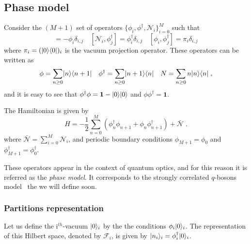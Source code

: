 \documentclass[a4paper,11pt]{amsart}
\begin{document}

\subsection{Phase model}
Consider the \((M+1)\) set of operators \(\{\phi_i,
\phi^\dagger,\mathcal{N}_i\}_{i=0}^M\) such that
\begin{equation}
 [\mathcal{N}_i, \phi_j] = - \phi_i \delta_{i,j} \quad
 [\mathcal{N}_i, \phi_j^\dagger] =  \phi_i^\dagger \delta_{i,j}  \quad 
 [\phi_i, \phi_j^\dagger] =  \pi_i \delta_{i,j}  
\end{equation}
where \(\pi_i =(\lvert0\rangle \langle0\rvert)_i\) is the vacuum projection operator.
These operators can be written as
\begin{equation}
\phi = \sum_{n\geq 0}\lvert n\rangle\langle n+1\rvert\quad 
\phi^\dagger = \sum_{n\geq 0}\lvert n+1\rangle\langle n\rvert \quad 
N = \sum_{n\geq 0}n\lvert n\rangle\langle n\rvert\; ,
\end{equation}
and it is easy to see that \(\phi^\dagger \phi = \bm{1} - \lvert0\rangle
\lvert0\rangle\) and \(\phi\phi^\dagger = \bm{1}\).

The Hamiltonian is given by
\begin{equation}
  H = - \frac{1}{2} \sum_{n =0}^M \left(\phi_n^\dagger \phi_{n+1}
  + \phi_n \phi_{n+1}^\dagger \right) + \bar{\mathcal{N}}\; .
\end{equation}
where \(\bar{\mathcal{N}} = \sum_{i=0}^M \mathcal{N}_i\), and
periodic boundary conditions \(\phi_{M+1} = \phi_0\) and
\(\phi_{M+1}^\dagger = \phi_0^\dagger\).

These operators appear in the context of quantum optics, and for
this reason it is referred as the \emph{phase model}. It 
corresponds to the strongly correlated \(q\)-bosons
model~\cite{Bogoliubov:1997soj} the we will define soon.

\subsubsection{Partitions representation}
Let us define the i\(^{th}\)-vacuum \(\lvert0\rangle_i\) by the the conditions 
\(\phi_i\lvert0\rangle_i\). The representation of this Hilbert space, denoted by
\(\mathcal{F}_i\), is given by \(\lvert n_i\rangle_i = \phi_i^\dagger \lvert0\rangle_i\). 
\end{document}
